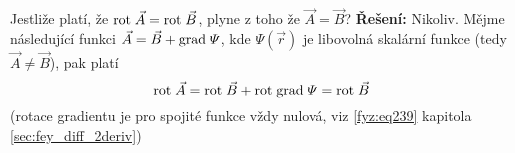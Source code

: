 \begin{mdframed}[style=mdexam]
\begin{example}
  Jestliže platí, že \(\mathrm{rot}\;\vec{A} = \mathrm{rot}\;\vec{B}\), plyne z toho že \(\vec{A}=\vec{B}\)?\newline  
  \textbf{Řešení:} 
  Nikoliv. Mějme následující funkci \(\vec{A} = \vec{B} + \mathrm{grad\;}\varPsi\), kde 
  \(\varPsi(\vec{r})\) je libovolná skalární funkce (tedy \(\vec{A}\neq\vec{B}\)), pak platí
  \[\mathrm{rot}\;\vec{A} = \mathrm{rot}\;\vec{B} +\mathrm{rot}\;\mathrm{grad\;}\varPsi = \mathrm{rot}\;\vec{B}\] (rotace gradientu je pro 
  spojité funkce vždy nulová, viz \ref{fyz:eq239} kapitola \ref{sec:fey_diff_2deriv})
\end{example}
\end{mdframed}